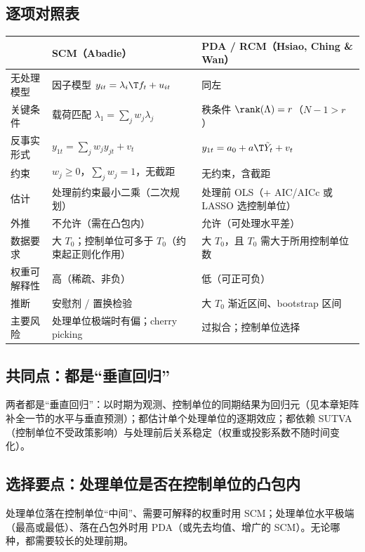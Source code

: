 \subsection{逐项对照表}

\begin{center}
\small
\begin{tabularx}{\linewidth}{lLL}
\toprule
 & SCM（Abadie） & PDA / RCM（Hsiao, Ching \& Wan）\\
\midrule
无处理模型 & 因子模型 $y_{it}=\lambda_i\T f_t+u_{it}$ & 同左\\
关键条件 & 载荷匹配 $\lambda_1=\sum_jw_j\lambda_j$ & 秩条件 $\rank(\Lambda)=r$（$N-1>r$）\\
反事实形式 & $y_{1t}=\sum_jw_jy_{jt}+v_t$ & $y_{1t}=a_0+a\T\tilde Y_t+v_t$\\
约束 & $w_j\ge0$，$\sum_jw_j=1$，无截距 & 无约束，含截距\\
估计 & 处理前约束最小二乘（二次规划） & 处理前 OLS（+ AIC/AICc 或 LASSO 选控制单位）\\
外推 & 不允许（需在凸包内） & 允许（可处理水平差）\\
数据要求 & 大 $T_0$；控制单位可多于 $T_0$（约束起正则化作用） & 大 $T_0$，且 $T_0$ 需大于所用控制单位数\\
权重可解释性 & 高（稀疏、非负） & 低（可正可负）\\
推断 & 安慰剂 / 置换检验 & 大 $T_0$ 渐近区间、bootstrap 区间\\
主要风险 & 处理单位极端时有偏；cherry picking & 过拟合；控制单位选择\\
\bottomrule
\end{tabularx}
\label{tab:U16-scm-pda}
\end{center}

\subsection{共同点：都是“垂直回归”}

两者都是“垂直回归”：以时期为观测、控制单位的同期结果为回归元（见本章矩阵补全一节的水平与垂直预测）；都估计单个处理单位的逐期效应；都依赖 SUTVA（控制单位不受政策影响）与处理前后关系稳定（权重或投影系数不随时间变化）。

\subsection{选择要点：处理单位是否在控制单位的凸包内}

处理单位落在控制单位“中间”、需要可解释的权重时用 SCM；处理单位水平极端（最高或最低）、落在凸包外时用 PDA（或先去均值、增广的 SCM）。无论哪种，都需要较长的处理前期。


